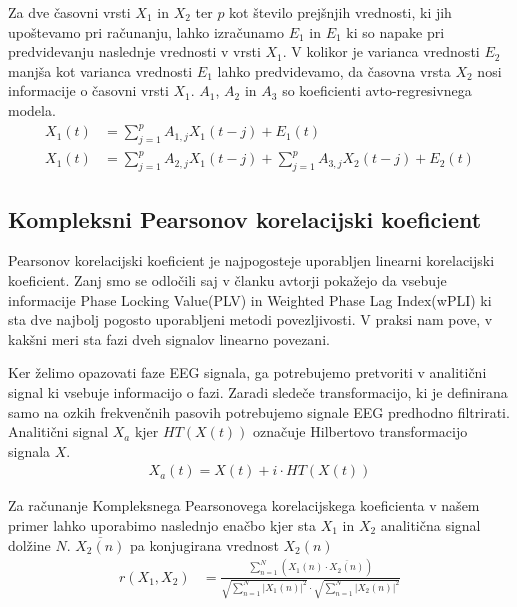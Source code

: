 Za dve časovni vrsti $X_1$ in $X_2$ ter $p$ kot število prejšnjih vrednosti, ki jih upoštevamo pri računanju, lahko izračunamo $E_1$ in $E_1$ ki so napake pri predvidevanju naslednje vrednosti v vrsti $X_1$. V kolikor je varianca vrednosti $E_2$ manjša kot varianca vrednosti $E_1$ lahko predvidevamo, da časovna vrsta $X_2$ nosi informacije o časovni vrsti $X_1$. $A_1$, $A_2$ in $A_3$ so koeficienti avto-regresivnega modela. \cite{sethGrangerCausality2007}
\begin{align*}
X_1(t) &= \sum_{j=1}^{p} A_{1,j} X_1(t-j) + E_1(t)\\
X_1(t) &= \sum_{j=1}^{p} A_{2,j} X_1(t-j) + \sum_{j=1}^{p} A_{3,j} X_2(t-j) + E_2(t)
\end{align*}


\subsection{Kompleksni Pearsonov korelacijski koeficient}
Pearsonov korelacijski koeficient je najpogosteje uporabljen linearni korelacijski koeficient. Zanj smo se odločili saj v članku  
avtorji pokažejo da vsebuje informacije Phase Locking Value(PLV) in Weighted Phase Lag Index(wPLI) ki sta dve najbolj pogosto uporabljeni metodi povezljivosti. V praksi nam pove, v kakšni meri sta fazi dveh signalov linearno povezani.\cite{sverkoComplexPearsonCorrelation2022} 

Ker želimo opazovati faze EEG signala, ga potrebujemo pretvoriti v analitični signal ki vsebuje informacijo o fazi. Zaradi sledeče transformacijo, ki je definirana samo na ozkih frekvenčnih pasovih potrebujemo signale EEG predhodno filtrirati. Analitični signal $X_a$ kjer $HT(X(t))$ označuje Hilbertovo transformacijo signala $X$.\cite{sverkoComplexPearsonCorrelation2022} 
\begin{align*}
    X_a(t) = X(t) + i \cdot HT(X(t))
\end{align*}

Za računanje Kompleksnega Pearsonovega korelacijskega koeficienta v našem primer lahko uporabimo naslednjo enačbo kjer sta $X_1$ in $X_2$ analitična signal dolžine $N$. $\overline{X_2(n)}$ pa konjugirana vrednost $X_2(n)$\cite{sverkoComplexPearsonCorrelation2022} 
\begin{align*}
r(X_1, X_2) &= \frac{\sum\limits_{n=1}^{N}(X_1(n) \cdot \overline{X_2(n)})}{\sqrt{\sum\limits_{n=1}^{N} |X_1(n)|^2} \cdot \sqrt{\sum\limits_{n=1}^{N} |X_2(n)|^2}}
\end{align*}

